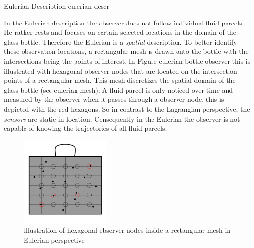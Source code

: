 

    




Eulerian Description
eulerian descr

In the Eulerian description the observer does not follow individual fluid parcels. He rather rests and focuses on certain selected locations in the domain of the glass bottle. Therefore the Eulerian is a \emph{spatial} description. To better identify these observation locations, a rectangular mesh is drawn onto the bottle with the intersections being the points of interest. In Figure eulerian bottle observer this is illustrated with hexagonal observer nodes that are located on the intersection points of a rectangular mesh. This mesh discretizes
the spatial domain of the glass bottle (see eulerian mesh). A fluid parcel is only noticed over time and measured by the observer when it passes through a observer node, this is depicted with the red hexagons. So in contrast to the Lagrangian perspective, the \emph{sensors} are static in location. Consequently in the Eulerian the observer is not capable of knowing the trajectories of all fluid parcels.

\begin{figure}[htb]
\centering
\includegraphics[width=0.4\textwidth]{../figures/olive_oil_can_eulerian.pdf}
\caption{Illustration of hexagonal observer nodes inside a rectangular mesh in Eulerian perspective}
\label{fig:eulerian_bottle_observer}
\end{figure}


